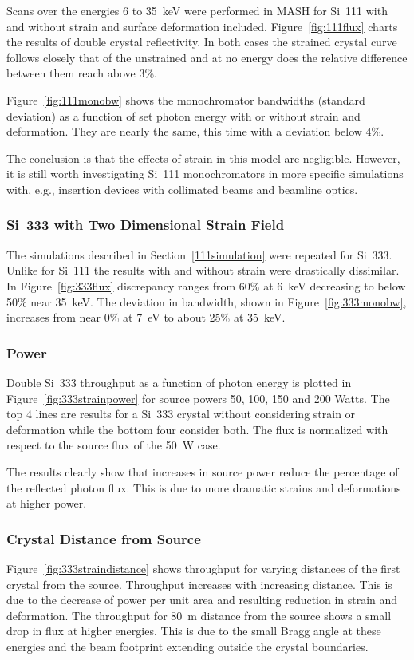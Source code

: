 \documentclass[preprint]{iucr}              %
\begin{document}
Scans over the energies 6 to 35~keV were performed in MASH for Si~111 with and without strain and surface deformation included. Figure~\ref{fig:111flux} charts the results of double crystal reflectivity. In both cases the strained crystal curve follows closely that of the unstrained and at no energy does the relative difference between them reach above 3\%.

Figure~\ref{fig:111monobw} shows the monochromator bandwidths (standard deviation) as a function of set photon energy with or without strain and deformation. They are nearly the same, this time with a deviation below 4\%.

The conclusion is that the effects of strain in this model are negligible. However, it is still worth investigating Si~111 monochromators in more specific simulations with, e.g., insertion devices with collimated beams and beamline optics.



\subsubsection{Si~333 with Two Dimensional Strain Field}\label{parameterscans}

The simulations described in Section~\ref{111simulation} were repeated for Si~333. Unlike for Si~111 the results with and without strain were drastically dissimilar. In Figure~\ref{fig:333flux} discrepancy ranges from 60\% at 6~keV decreasing to below 50\% near 35~keV. The deviation in bandwidth, shown in Figure~\ref{fig:333monobw}, increases from near 0\% at 7~eV to about 25\% at 35~keV.


\subsubsection{Power}
Double Si~333 throughput as a function of photon energy is plotted in Figure~\ref{fig:333strainpower} for source powers 50, 100, 150 and 200 Watts. The top 4 lines are results for a Si~333 crystal without considering strain or deformation while the bottom four consider both. The flux is normalized with respect to the source flux of the 50~W case.

The results clearly show that increases in source power reduce the percentage of the reflected photon flux. This is due to more dramatic strains and deformations at higher power.

\subsubsection{Crystal Distance from Source}
Figure~\ref{fig:333straindistance} shows throughput for varying distances of the first crystal from the source. Throughput increases with increasing distance. This is due to the decrease of power per unit area and resulting reduction in strain and deformation. The throughput for 80~m distance from the source shows a small drop in flux at higher energies. This is due to the small Bragg angle at these energies and the beam footprint extending outside the crystal boundaries.
\end{document}
